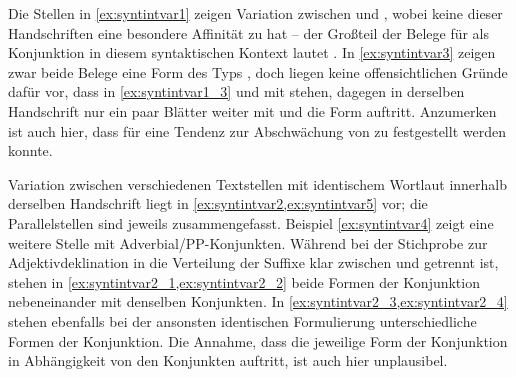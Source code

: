 Die Stellen in \cref{ex:syntintvar1} zeigen Variation zwischen \citet{kc:B1}
und \citet{kc:VB}, wobei keine dieser Handschriften eine besondere Affinität zu
 hat -- der Großteil der Belege für  als
Konjunktion in diesem syntaktischen Kontext lautet . In
\cref{ex:syntintvar3} zeigen zwar beide Belege eine Form des Typs
, doch liegen keine offensichtlichen Gründe dafür vor, dass in
\cref{ex:syntintvar1_3}   und  
mit  stehen, dagegen in der\-selben Handschrift nur ein paar Blätter
weiter mit   und   die Form
 auftritt. Anzumerken ist auch hier, dass für \citet{kc:VB} eine
Tendenz zur Abschwächung von  zu  festgestellt werden
konnte.

Variation zwischen verschiedenen Textstellen mit identischem Wortlaut innerhalb
der\-selben Handschrift liegt in \cref{ex:syntintvar2,ex:syntintvar5} vor; die
Parallelstellen sind jeweils zusammengefasst. Beispiel \cref{ex:syntintvar4}
zeigt eine weitere Stelle mit Adverbial/PP-Konjunkten. Während bei der
Stichprobe zur Adjektivdeklination in \citet{kc:B1} die Verteilung der Suffixe
klar zwischen  und  getrennt ist, stehen in
\cref{ex:syntintvar2_1,ex:syntintvar2_2} beide Formen der Konjunktion
nebeneinander mit denselben Konjunkten. In
\cref{ex:syntintvar2_3,ex:syntintvar2_4} stehen ebenfalls bei der ansonsten
identischen Formulierung unterschiedliche Formen der Konjunktion. Die Annahme,
dass die jeweilige Form der Konjunktion in Abhängigkeit von den Konjunkten
auftritt, ist auch hier unplausibel.


